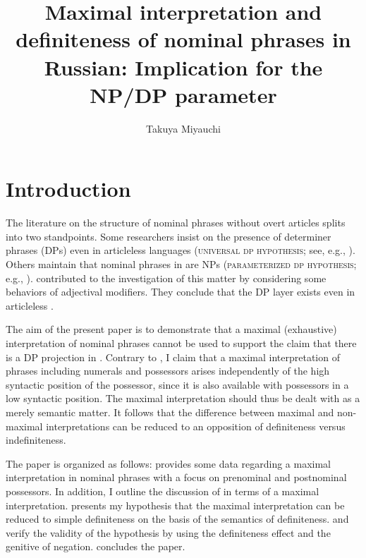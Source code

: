 \documentclass[output=paper]{langscibook}
\title[Maximal interpretation and definiteness of nominal phrases in Russian]
      {Maximal interpretation and definiteness of nominal phrases in Russian: Implication for the NP/DP parameter}
\author{Takuya Miyauchi\orcid{0000-0003-4836-1617}\affiliation{The University of Tokyo}}
\begin{document}
\maketitle

\section{Introduction}
The literature on the structure of  nominal phrases without overt articles splits into two standpoints. Some researchers insist on the presence of determiner phrases (DPs) even in articleless  languages (\textsc{universal dp hypothesis}; see, e.g., \citealt{Progovac1998,Rappaport2002,Rutkowski2002,Basic2004,Franks.Pereltsvaig2004, Pereltsvaig2007,Rutkowski.Maliszewska2007}). Others maintain that nominal phrases in  are NPs (\textsc{parameterized dp hypothesis}; e.g., \citealt{Zlatic1998,Trenkic2004,Boskovic2005,Boskovic2007,Boskovic2009,Despic2013}). \citet{Kagan.Pereltsvaig2012} contributed to the investigation of this matter by considering some behaviors of adjectival modifiers. They conclude that the DP layer exists even in articleless .

The aim of the present paper is to demonstrate that a maximal (exhaustive) interpretation of nominal phrases cannot be used to support the claim that there is a DP projection in . Contrary to \citet{Kagan.Pereltsvaig2012}, I claim that a maximal interpretation of phrases including numerals and possessors arises independently of the high syntactic position of the possessor, since it is also available with possessors in a low syntactic position. The maximal interpretation should thus be dealt with as a merely semantic matter. It follows that the difference between maximal and non-maximal interpretations can be reduced to an opposition of definiteness versus indefiniteness.

The paper is organized as follows:  provides some data regarding a maximal interpretation in  nominal phrases with a focus on prenominal and postnominal possessors. In addition, I outline the discussion of \citet{Kagan.Pereltsvaig2012} in terms of a maximal interpretation.  presents my hypothesis that the maximal interpretation can be reduced to simple definiteness on the basis of the semantics of definiteness.  and  verify the validity of the hypothesis by using the definiteness effect and the genitive of negation.  concludes the paper.
\end{document}

